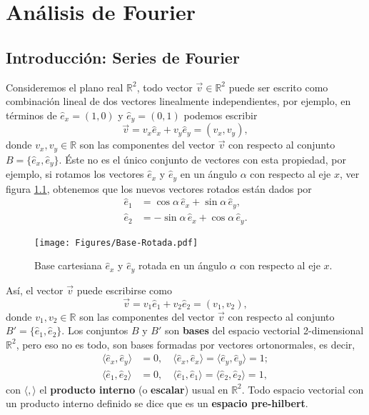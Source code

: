 \chapter{Análisis de Fourier} \label{chp:Fourier}

\section{Introducción: Series de Fourier}

Consideremos el plano real $\mathbb{R}^2$, todo vector $\vec{v} \in \mathbb{R}^2$ puede ser escrito como combinación lineal de dos vectores linealmente independientes, por ejemplo, en términos de $\hat{e}_x = (1,0)$ y $\hat{e}_y = (0,1)$ podemos escribir
\begin{equation}
    \vec{v} = v_{x} \hat{e}_{x} + v_{y} \hat{e}_{y} = (v_x,v_y),
\end{equation}
donde $v_{x}, v_{y} \in \mathbb{R}$ son las componentes del vector $\vec{v}$ con respecto al conjunto $B = \{\hat{e}_x,\hat{e}_y\}$. Éste no es el único conjunto de vectores con esta propiedad, por ejemplo, si rotamos los vectores $\hat{e}_x$ y $\hat{e}_y$ en un ángulo $\alpha$ con respecto al eje $x$, ver figura \ref{fig:rotated-basis}, obtenemos que los nuevos vectores rotados están dados por
\begin{align}
    \hat{e}_{1} &= \cos\alpha \, \hat{e}_x + \sin\alpha \, \hat{e}_{y}, \\
    \hat{e}_{2} &= - \sin\alpha \, \hat{e}_x + \cos\alpha \, \hat{e}_{y}.
\end{align}

\begin{figure}
    \centering
    \texttt{[image: Figures/Base-Rotada.pdf]}
    \caption{Base cartesiana $\hat{e}_x$ y $\hat{e}_y$ rotada en un ángulo $\alpha$ con respecto al eje $x$.}
    \label{fig:rotated-basis}
\end{figure}

Así, el vector $\vec{v}$ puede escribirse como
\begin{equation}
    \vec{v} = v_{1} \hat{e}_{1} + v_{2} \hat{e}_{2} = (v_1,v_2),
\end{equation}
donde $v_{1}, v_{2} \in \mathbb{R}$ son las componentes del vector $\vec{v}$ con respecto al conjunto $B' = \{\hat{e}_1,\hat{e}_2\}$. Los conjuntos $B$ y $B'$ son \textbf{bases} del espacio vectorial 2-dimensional $\mathbb{R}^2$, pero eso no es todo, son bases formadas por vectores ortonormales, es decir, 
\begin{align}
    \langle \hat{e}_{x}, \hat{e}_{y} \rangle &= 0, \quad  \langle \hat{e}_{x}, \hat{e}_{x} \rangle = \langle \hat{e}_{y}, \hat{e}_{y} \rangle = 1; \\
    \langle \hat{e}_{1}, \hat{e}_{2} \rangle &= 0, \quad  \langle \hat{e}_{1}, \hat{e}_{1} \rangle = \langle \hat{e}_{2}, \hat{e}_{2} \rangle = 1,
\end{align}
con $\langle , \rangle$ el \textbf{producto interno} (o \textbf{escalar}) usual en $\mathbb{R}^2$. Todo espacio vectorial con un producto interno definido se dice que es un \textbf{espacio pre-hilbert}.

